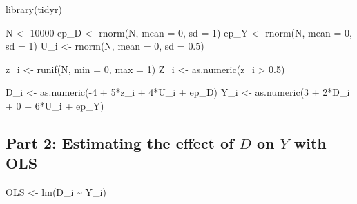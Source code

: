 \documentclass[
  letterpaper,
  DIV=11,
  numbers=noendperiod]{scrartcl}
\newenvironment{Shaded}{\begin{snugshade}}{\end{snugshade}}
\newcommand{\AttributeTok}[1]{\textcolor[rgb]{0.40,0.45,0.13}{#1}}
\newcommand{\DecValTok}[1]{\textcolor[rgb]{0.68,0.00,0.00}{#1}}
\newcommand{\FloatTok}[1]{\textcolor[rgb]{0.68,0.00,0.00}{#1}}
\newcommand{\FunctionTok}[1]{\textcolor[rgb]{0.28,0.35,0.67}{#1}}
\newcommand{\NormalTok}[1]{\textcolor[rgb]{0.00,0.23,0.31}{#1}}
\newcommand{\OtherTok}[1]{\textcolor[rgb]{0.00,0.23,0.31}{#1}}
\newcommand{\SpecialCharTok}[1]{\textcolor[rgb]{0.37,0.37,0.37}{#1}}
\begin{document}
\begin{Shaded}
\begin{Highlighting}[]
\FunctionTok{library}\NormalTok{(tidyr)}

\NormalTok{N }\OtherTok{\textless{}{-}} \DecValTok{10000}
\NormalTok{ep\_D }\OtherTok{\textless{}{-}} \FunctionTok{rnorm}\NormalTok{(N, }\AttributeTok{mean =} \DecValTok{0}\NormalTok{, }\AttributeTok{sd =} \DecValTok{1}\NormalTok{)}
\NormalTok{ep\_Y }\OtherTok{\textless{}{-}} \FunctionTok{rnorm}\NormalTok{(N, }\AttributeTok{mean =} \DecValTok{0}\NormalTok{, }\AttributeTok{sd =} \DecValTok{1}\NormalTok{)}
\NormalTok{U\_i }\OtherTok{\textless{}{-}} \FunctionTok{rnorm}\NormalTok{(N, }\AttributeTok{mean =} \DecValTok{0}\NormalTok{, }\AttributeTok{sd =} \FloatTok{0.5}\NormalTok{)}

\NormalTok{z\_i }\OtherTok{\textless{}{-}} \FunctionTok{runif}\NormalTok{(N, }\AttributeTok{min =} \DecValTok{0}\NormalTok{, }\AttributeTok{max =} \DecValTok{1}\NormalTok{)}
\NormalTok{Z\_i }\OtherTok{\textless{}{-}} \FunctionTok{as.numeric}\NormalTok{(z\_i }\SpecialCharTok{\textgreater{}} \FloatTok{0.5}\NormalTok{)}

\NormalTok{D\_i }\OtherTok{\textless{}{-}} \FunctionTok{as.numeric}\NormalTok{(}\SpecialCharTok{{-}}\DecValTok{4} \SpecialCharTok{+} \DecValTok{5}\SpecialCharTok{*}\NormalTok{z\_i }\SpecialCharTok{+} \DecValTok{4}\SpecialCharTok{*}\NormalTok{U\_i }\SpecialCharTok{+}\NormalTok{ ep\_D)}
\NormalTok{Y\_i }\OtherTok{\textless{}{-}} \FunctionTok{as.numeric}\NormalTok{(}\DecValTok{3} \SpecialCharTok{+} \DecValTok{2}\SpecialCharTok{*}\NormalTok{D\_i }\SpecialCharTok{+} \DecValTok{0} \SpecialCharTok{+} \DecValTok{6}\SpecialCharTok{*}\NormalTok{U\_i }\SpecialCharTok{+}\NormalTok{ ep\_Y)}
\end{Highlighting}
\end{Shaded}

\subsection{\texorpdfstring{Part 2: Estimating the effect of \(D\) on
\(Y\) with
OLS}{Part 2: Estimating the effect of D on Y with OLS}}\label{part-2-estimating-the-effect-of-d-on-y-with-ols}

\begin{Shaded}
\begin{Highlighting}[]
\NormalTok{OLS }\OtherTok{\textless{}{-}} \FunctionTok{lm}\NormalTok{(D\_i }\SpecialCharTok{\textasciitilde{}}\NormalTok{ Y\_i)}
\end{Highlighting}
\end{Shaded}
\end{document}

